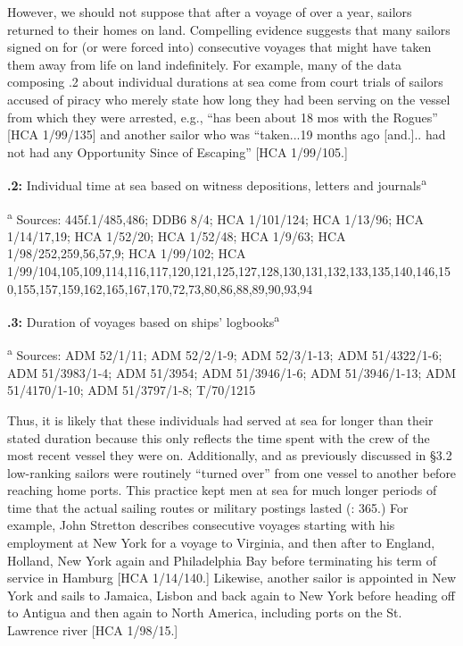 However, we should not suppose that after a voyage of over a year, sailors returned to their homes on land. Compelling evidence suggests that many sailors signed on for (or were forced into) consecutive voyages that might have taken them away from life on land indefinitely. For example, many of the data composing .2 about individual durations at sea come from court trials of sailors accused of piracy who merely state how long they had been serving on the vessel from which they were arrested, e.g., “has been about 18 mos with the Rogues” [HCA 1/99/135] and another sailor who was “taken...19 months ago [and.].. had not had any Opportunity Since of Escaping” [HCA 1/99/105.]

  
 

\textbf{.2:} Individual time at sea based on witness depositions, letters and journals\textsuperscript{a} 

\textsuperscript{a} Sources: 445f.1/485,486; DDB6 8/4; HCA 1/101/124; HCA 1/13/96; HCA 1/14/17,19; HCA 1/52/20; HCA 1/52/48; HCA 1/9/63; HCA 1/98/252,259,56,57,9; HCA 1/99/102; HCA 1/99/104,105,109,114,116,117,120,121,125,127,128,130,131,132,133,135,140,146,150,155,157,159,162,165,167,170,72,73,80,86,88,89,90,93,94

  
 

\textbf{.3:} Duration of voyages based on ships’ logbooks\textsuperscript{a}

\textsuperscript{a} Sources: ADM 52/1/11; ADM 52/2/1-9; ADM 52/3/1-13; ADM 51/4322/1-6; ADM 51/3983/1-4; ADM 51/3954; ADM 51/3946/1-6; ADM 51/3946/1-13; ADM 51/4170/1-10; ADM 51/3797/1-8; T/70/1215

Thus, it is likely that these individuals had served at sea for longer than their stated duration because this only reflects the time spent with the crew of the most recent vessel they were on. Additionally, and as previously discussed in §3.2 low-ranking sailors were routinely “turned over” from one vessel to another before reaching home ports. This practice kept men at sea for much longer periods of time that the actual sailing routes or military postings lasted (\citealt{AdkinsAdkins2008}: 365.) For example, John Stretton describes consecutive voyages starting with his employment at New York for a voyage to Virginia, and then after to England, Holland, New York again and Philadelphia Bay before terminating his term of service in Hamburg [HCA 1/14/140.] Likewise, another sailor is appointed in New York and sails to Jamaica, Lisbon and back again to New York before heading off to Antigua and then again to North America, including ports on the St. Lawrence river [HCA 1/98/15.] 

